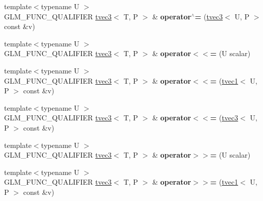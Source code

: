 \begin{DoxyCompactItemize}
\item 
\hypertarget{structglm_1_1tvec3_aaf5a7e57c8fe6292695624a42b69c339}{{\footnotesize template$<$typename U $>$ }\\G\-L\-M\-\_\-\-F\-U\-N\-C\-\_\-\-Q\-U\-A\-L\-I\-F\-I\-E\-R \hyperlink{structglm_1_1tvec3}{tvec3}$<$ T, P $>$ \& {\bfseries operator$^\wedge$=} (\hyperlink{structglm_1_1tvec3}{tvec3}$<$ U, P $>$ const \&v)}\label{structglm_1_1tvec3_aaf5a7e57c8fe6292695624a42b69c339}

\item 
\hypertarget{structglm_1_1tvec3_adf4b78d96e7c46c98751a39d26d6822d}{{\footnotesize template$<$typename U $>$ }\\G\-L\-M\-\_\-\-F\-U\-N\-C\-\_\-\-Q\-U\-A\-L\-I\-F\-I\-E\-R \hyperlink{structglm_1_1tvec3}{tvec3}$<$ T, P $>$ \& {\bfseries operator$<$$<$=} (U scalar)}\label{structglm_1_1tvec3_adf4b78d96e7c46c98751a39d26d6822d}

\item 
\hypertarget{structglm_1_1tvec3_a3eadadf25a3ef2e34bb1b6b7f192384a}{{\footnotesize template$<$typename U $>$ }\\G\-L\-M\-\_\-\-F\-U\-N\-C\-\_\-\-Q\-U\-A\-L\-I\-F\-I\-E\-R \hyperlink{structglm_1_1tvec3}{tvec3}$<$ T, P $>$ \& {\bfseries operator$<$$<$=} (\hyperlink{structglm_1_1tvec1}{tvec1}$<$ U, P $>$ const \&v)}\label{structglm_1_1tvec3_a3eadadf25a3ef2e34bb1b6b7f192384a}

\item 
\hypertarget{structglm_1_1tvec3_a7c12511c3769c0e7822bc884af40f3a2}{{\footnotesize template$<$typename U $>$ }\\G\-L\-M\-\_\-\-F\-U\-N\-C\-\_\-\-Q\-U\-A\-L\-I\-F\-I\-E\-R \hyperlink{structglm_1_1tvec3}{tvec3}$<$ T, P $>$ \& {\bfseries operator$<$$<$=} (\hyperlink{structglm_1_1tvec3}{tvec3}$<$ U, P $>$ const \&v)}\label{structglm_1_1tvec3_a7c12511c3769c0e7822bc884af40f3a2}

\item 
\hypertarget{structglm_1_1tvec3_a2a74bf77a4e9edbe14166fdfedb7f3f9}{{\footnotesize template$<$typename U $>$ }\\G\-L\-M\-\_\-\-F\-U\-N\-C\-\_\-\-Q\-U\-A\-L\-I\-F\-I\-E\-R \hyperlink{structglm_1_1tvec3}{tvec3}$<$ T, P $>$ \& {\bfseries operator$>$$>$=} (U scalar)}\label{structglm_1_1tvec3_a2a74bf77a4e9edbe14166fdfedb7f3f9}

\item 
\hypertarget{structglm_1_1tvec3_a2f08b19372b6573b24cb81ed5657f8a3}{{\footnotesize template$<$typename U $>$ }\\G\-L\-M\-\_\-\-F\-U\-N\-C\-\_\-\-Q\-U\-A\-L\-I\-F\-I\-E\-R \hyperlink{structglm_1_1tvec3}{tvec3}$<$ T, P $>$ \& {\bfseries operator$>$$>$=} (\hyperlink{structglm_1_1tvec1}{tvec1}$<$ U, P $>$ const \&v)}\label{structglm_1_1tvec3_a2f08b19372b6573b24cb81ed5657f8a3}


\end{DoxyCompactItemize}
